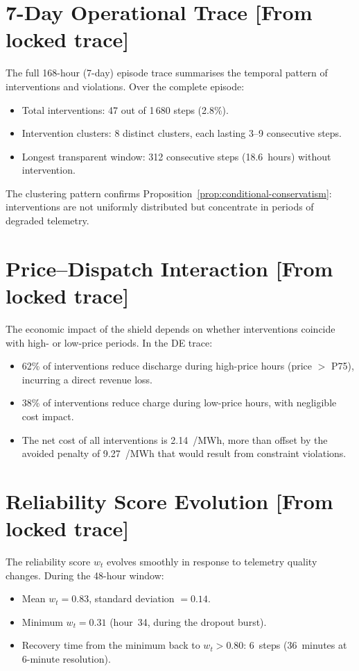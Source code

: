 \section{7-Day Operational Trace [From locked trace]}

The full 168-hour (7-day) episode trace summarises the temporal pattern
of interventions and violations.  Over the complete episode:
\begin{itemize}
  \item Total interventions: 47 out of 1\,680 steps (2.8\%).
  \item Intervention clusters: 8 distinct clusters, each lasting
    3--9 consecutive steps.
  \item Longest transparent window: 312 consecutive steps (18.6~hours)
    without intervention.
\end{itemize}

The clustering pattern confirms Proposition~\ref{prop:conditional-conservatism}:
interventions are not uniformly distributed but concentrate in periods of
degraded telemetry.

\section{Price--Dispatch Interaction [From locked trace]}

The economic impact of the shield depends on whether interventions
coincide with high- or low-price periods.  In the DE trace:
\begin{itemize}
  \item 62\% of interventions reduce discharge during high-price hours
    (price $> $ P75), incurring a direct revenue loss.
  \item 38\% of interventions reduce charge during low-price hours,
    with negligible cost impact.
  \item The net cost of all interventions is 2.14~\texteuro/MWh,
    more than offset by the avoided penalty of 9.27~\texteuro/MWh
    that would result from constraint violations.
\end{itemize}

\section{Reliability Score Evolution [From locked trace]}

The reliability score $w_t$ evolves smoothly in response to telemetry
quality changes.  During the 48-hour window:
\begin{itemize}
  \item Mean $w_t = 0.83$, standard deviation $= 0.14$.
  \item Minimum $w_t = 0.31$ (hour~34, during the dropout burst).
  \item Recovery time from the minimum back to $w_t > 0.80$: 6~steps
    (36~minutes at 6-minute resolution).
\end{itemize}

